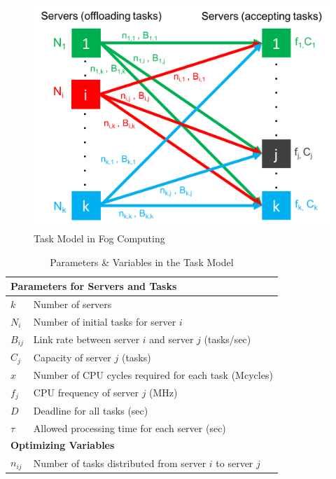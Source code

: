 \begin{figure}[ht!]
\centering
\includegraphics[width=0.8\linewidth]{images/opt_gen}
\caption{Task Model in Fog Computing}
\label{opt_gen}
\end{figure}



\begin{table}[h]
\caption{Parameters \& Variables in the Task Model}
\small
\centering
\begin{tabular}{| m{1cm} |  m{15em} |}
    \hline
    \multicolumn{2}{|l|}{\textbf{Parameters for Servers and Tasks}}\\
    \hline
    $k$ & Number of servers \\
    \hline
    $N_{i}$ & Number of initial tasks for server $i$\\
    \hline
    $B_{ij}$ & Link rate between server $i$ and server $j$ (tasks/sec)\\
    \hline
    $C_{j}$ & Capacity of server $j$ (tasks)\\
    \hline
    $x$ & Number of CPU cycles required for each task (Mcycles)\\
    \hline
    $f_{j}$ & CPU frequency of server $j$ (MHz)\\
    \hline
    $D$ & Deadline for all tasks (sec)\\
    \hline
    $\tau$ & Allowed processing time for each server (sec)\\
    \hline\hline
    \multicolumn{2}{|l|}{\textbf{Optimizing Variables}}\\
    \hline
    $n_{ij}$ & Number of tasks distributed from server $i$ to server $j$\\
    \hline
\end{tabular}
\label{fogsysvar}
\end{table}


